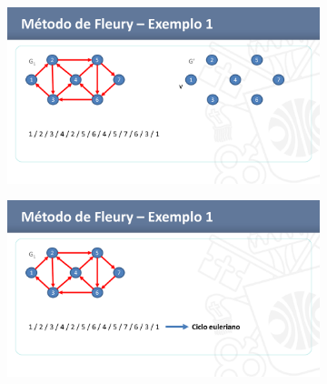 \begin{figure}[htbp]  
    \begin{subfigure}{.4\textwidth}
		\includegraphics[width=\textwidth]{imagem/graficos/1a1455b7b9174768d1c6a0d41673e79dHTztESkzBtQzsXWu-49.png}
	\end{subfigure}
    \begin{subfigure}{.4\textwidth}
		\includegraphics[width=\textwidth]{imagem/graficos/1a1455b7b9174768d1c6a0d41673e79dHTztESkzBtQzsXWu-50.png}
	\end{subfigure}
\end{figure}

